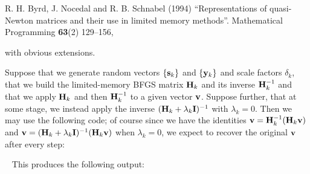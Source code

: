\documentclass{galahad}
\begin{document}
\noindent
R. H. Byrd, J. Nocedal and R. B. Schnabel (1994)
``Representations of quasi-Newton matrices and their use in
limited memory methods''.
Mathematical Programming {\bf 63}(2) 129--156,
\vspace*{1mm}

\noindent
with obvious extensions.


\galexample
Suppose that we generate random vectors $\{{\mathbf{s}}_k\}$ and $\{{\mathbf{y}}_k\}$
and scale factors $\delta_k$, that we build the limited-memory BFGS
matrix ${\mathbf{H}}_k$ and its inverse ${\mathbf{H}}_k^{-1}$ and that we apply
${\mathbf{H}}_k$ and then ${\mathbf{H}}_k^{-1}$ to a given vector ${\mathbf{v}}$. Suppose further,
that at some stage, we instead apply the inverse $({\mathbf{H}}_k+\lambda_k{\mathbf{I}})^{-1}$
with $\lambda_k = 0$. Then we may use the following code; of course since
we have the identities ${\mathbf{v}} = {\mathbf{H}}_k^{-1} ( {\mathbf{H}}_k {\mathbf{v}} )$ and
${\mathbf{v}} = ( {\mathbf{H}}_k + \lambda_k {\mathbf{I}}) ^{-1} ( {\mathbf{H}}_k {\mathbf{v}} )$ when $\lambda_k = 0$,
we expect to recover the original ${\mathbf{v}}$ after every step:

{\tt \small
\VerbatimInput{\packageexample}
}
\noindent
This produces the following output:
{\tt \small
\VerbatimInput{\packageresults}
}
\end{document}
